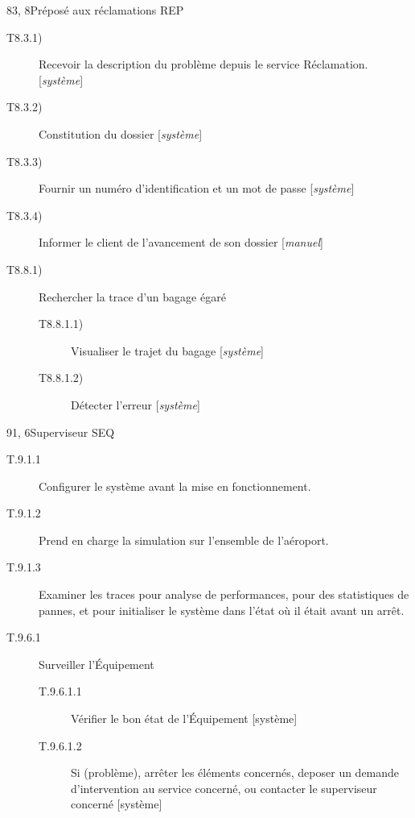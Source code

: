 \dta
{8}{3, 8}{Préposé aux réclamations}
{REP}
{
\begin{description}
	\item [T8.3.1)] Recevoir la description du problème depuis le service \og Réclamation\fg. [\textsl{système}]
	\item [T8.3.2)] Constitution du dossier [\textsl{système}] 
	\item [T8.3.3)] Fournir un numéro d'identification et un mot de passe [\textsl{système}]
	\item [T8.3.4)] Informer le client de l'avancement de son dossier [\textsl{manuel}]
	\item [T8.8.1)] Rechercher la trace d'un bagage égaré
	\begin{description}
		\item [T8.8.1.1)] Visualiser le trajet du bagage [\textsl{système}]
		\item [T8.8.1.2)] Détecter l'erreur [\textsl{système}]
	\end{description}
\end{description}
}

\hspace{1cm}

\dta
{9}{1, 6}{Superviseur}
{SEQ}
{
\begin{description}
	\item[T.9.1.1] Configurer le système avant la mise en fonctionnement.
	\item[T.9.1.2] Prend en charge la simulation sur l'ensemble de l'aéroport.
	\item[T.9.1.3] Examiner les traces pour analyse de performances, pour des statistiques de pannes, et pour initialiser le système dans l'état où il était avant un arrêt.
	\item[T.9.6.1] Surveiller l'Équipement
	\begin{description}
		\item[T.9.6.1.1] Vérifier le bon état de l'Équipement [système]
		\item[T.9.6.1.2] Si (problème), arrêter les éléments concernés, deposer un
		demande d'intervention au service concerné, ou contacter le superviseur concerné [système]
	\end{description}
\end{description}
}
